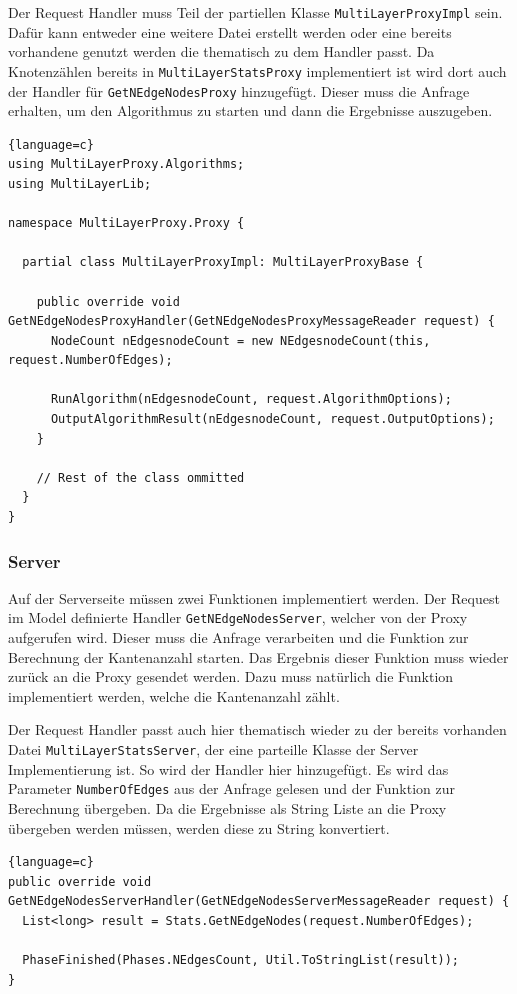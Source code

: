 Der Request Handler muss Teil der partiellen Klasse \verb|MultiLayerProxyImpl| sein. Dafür kann entweder eine weitere Datei erstellt werden oder eine bereits vorhandene genutzt werden die thematisch zu dem Handler passt.
Da Knotenzählen bereits in \verb|MultiLayerStatsProxy| implementiert ist wird dort auch der Handler für \verb|GetNEdgeNodesProxy| hinzugefügt. Dieser muss die Anfrage erhalten, um den Algorithmus zu starten und dann die Ergebnisse auszugeben.

\begin{lstlisting}{language=c}
using MultiLayerProxy.Algorithms;
using MultiLayerLib;

namespace MultiLayerProxy.Proxy {

  partial class MultiLayerProxyImpl: MultiLayerProxyBase {

    public override void GetNEdgeNodesProxyHandler(GetNEdgeNodesProxyMessageReader request) {
      NodeCount nEdgesnodeCount = new NEdgesnodeCount(this, request.NumberOfEdges);

      RunAlgorithm(nEdgesnodeCount, request.AlgorithmOptions);
      OutputAlgorithmResult(nEdgesnodeCount, request.OutputOptions);
    }
  
    // Rest of the class ommitted
  }
}
\end{lstlisting}



\subsubsection{Server}

Auf der Serverseite müssen zwei Funktionen implementiert werden. Der Request im Model definierte Handler \verb|GetNEdgeNodesServer|, welcher von der Proxy aufgerufen wird. Dieser muss die Anfrage verarbeiten und die Funktion zur Berechnung der Kantenanzahl starten. Das Ergebnis dieser Funktion muss wieder zurück an die Proxy gesendet werden.
Dazu muss natürlich die Funktion implementiert werden, welche die Kantenanzahl zählt.

Der Request Handler passt auch hier thematisch wieder zu der bereits vorhanden Datei \verb|MultiLayerStatsServer|, der eine parteille Klasse der Server Implementierung ist. So wird der Handler hier hinzugefügt.
Es wird das Parameter \verb|NumberOfEdges| aus der Anfrage gelesen und der Funktion zur Berechnung übergeben. Da die Ergebnisse als String Liste an die Proxy übergeben werden müssen, werden diese zu String konvertiert.


\begin{lstlisting}{language=c}
public override void GetNEdgeNodesServerHandler(GetNEdgeNodesServerMessageReader request) {
  List<long> result = Stats.GetNEdgeNodes(request.NumberOfEdges);

  PhaseFinished(Phases.NEdgesCount, Util.ToStringList(result));
}
\end{lstlisting}

